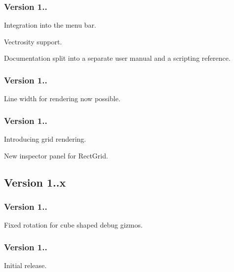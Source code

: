 \subsubsection*{Version 1..}


\begin{DoxyItemize}
\item Integration into the menu bar.
\item Vectrosity support.
\item Documentation split into a separate user manual and a scripting reference.
\end{DoxyItemize}

\subsubsection*{Version 1..}


\begin{DoxyItemize}
\item Line width for rendering now possible.
\end{DoxyItemize}

\subsubsection*{Version 1..}


\begin{DoxyItemize}
\item Introducing grid rendering.
\item New inspector panel for {\ttfamily Rect\+Grid}. 


\end{DoxyItemize}

\subsection*{Version 1..\+x }

\subsubsection*{Version 1..}


\begin{DoxyItemize}
\item Fixed rotation for cube shaped debug gizmos.
\end{DoxyItemize}

\subsubsection*{Version 1..}


\begin{DoxyItemize}
\item Initial release. 
\end{DoxyItemize}